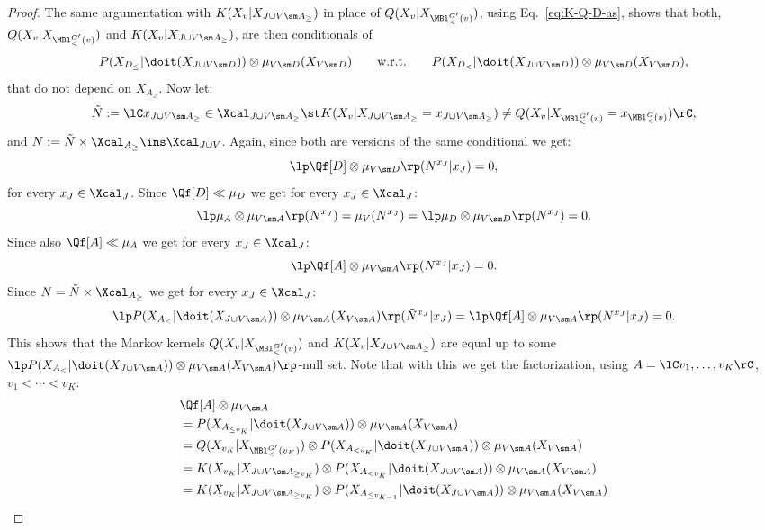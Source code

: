 \begin{Thm}
\begin{proof}
      The same argumentation with $K(X_v|X_{J \cup V \sm A_\ge})$ in place of $Q(X_v|X_{\MBl^{G'}_<(v)})$, 
      using Eq.\ \ref{eq:K-Q-D-as}, shows that both, $Q(X_v|X_{\MBl^{G'}_<(v)})$ and $K(X_v|X_{J \cup V \sm A_\ge})$, 
    are then conditionals of
    \[  P(X_{D_\le}|\doit(X_{J \cup V \sm D})) \otimes \mu_{V\sm D}(X_{V\sm D}) \qquad \text{w.r.t.} \qquad
          P(X_{D_<}|\doit(X_{J \cup V \sm D}))\otimes \mu_{V\sm D}(X_{V\sm D}), \] 
    that do not depend on $X_{A_\ge}$.
    Now let:
       \[ \tilde N := \lC x_{J \cup V \sm A_\ge} \in \Xcal_{J \cup V \sm A_\ge}  
            \st K(X_v|X_{J \cup V \sm A_\ge}=x_{J \cup V \sm A_\ge})
        \neq Q(X_v|X_{\MBl^{G'}_<(v)} = x_{\MBl^G_<(v)}) \rC, \]
        and $N:= \tilde N \times \Xcal_{A_\ge} \ins \Xcal_{J \cup V}$. 
        Again, since both are versions of the same conditional we get:
        \[ \lp \Qf[D] \otimes \mu_{V \sm D} \rp (N^{x_J}|x_J) = 0,\]
        for every $x_J \in \Xcal_J$. Since $\Qf[D] \ll \mu_D$ we get for every $x_J \in \Xcal_J$:
        \[ \lp \mu_A \otimes \mu_{V \sm A} \rp (N^{x_J}) = \mu_V (N^{x_J}) =\lp \mu_D \otimes \mu_{V \sm D} \rp (N^{x_J}) = 0.\]
        Since also $\Qf[A] \ll \mu_A$ we get for every $x_J \in \Xcal_J$:
            \[ \lp \Qf[A] \otimes \mu_{V \sm A} \rp (N^{x_J}|x_J) = 0.\]
        Since $N= \tilde N \times \Xcal_{A_\ge}$ we get for every $x_J \in \Xcal_J$:
        \[ \lp P(X_{A_<}|\doit(X_{J \cup V \sm A})) \otimes \mu_{V\sm A}(X_{V \sm A}) \rp (\tilde N^{x_J}|x_J) = 
        \lp \Qf[A] \otimes \mu_{V \sm A} \rp (N^{x_J}|x_J) = 0.  \]
       This shows that the Markov kernels $Q(X_v|X_{\MBl^{G'}_<(v)})$ and $K(X_v|X_{J \cup V \sm A_\ge})$ are equal up to some
        $\lp P(X_{A_<}|\doit(X_{J \cup V \sm A})) \otimes \mu_{V\sm A}(X_{V \sm A}) \rp$-null set.
        Note that with this we get the factorization, using $A=\lC v_1,\dots,v_K \rC$, $v_1 < \cdots < v_K$:
        \begin{align*}
           & \Qf[A] \otimes \mu_{V \sm A} \\
           & = P(X_{A_{\le v_K}}|\doit(X_{J \cup V \sm A})) \otimes \mu_{V \sm A}(X_{V \sm A}) \\
           & = Q(X_{v_K}|X_{\MBl^{G'}_<(v_K)}) \otimes P(X_{A_{< v_K}}|\doit(X_{J \cup V \sm A})) \otimes \mu_{V \sm A}(X_{V \sm A}) \\
           & = K(X_{v_K}|X_{J \cup V \sm A_{\ge v_K}}) \otimes P(X_{A_{< v_K}}|\doit(X_{J \cup V \sm A})) \otimes \mu_{V \sm A}(X_{V \sm A}) \\
           & = K(X_{v_K}|X_{J \cup V \sm A_{\ge v_K}}) \otimes P(X_{A_{\le v_{K-1}}}|\doit(X_{J \cup V \sm A})) \otimes \mu_{V \sm A}(X_{V \sm A}) \\

\end{align*}
\end{proof}
\end{Thm}
